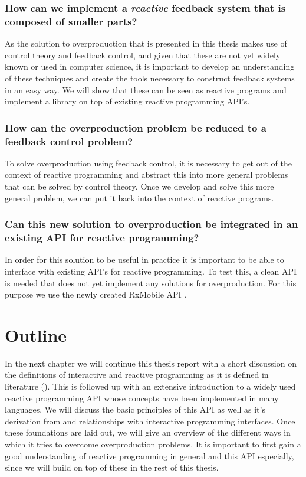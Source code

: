\subsubsection*{How can we implement a \emph{reactive} feedback system that is composed of smaller parts?} 
As the solution to overproduction that is presented in this thesis makes use of control theory and feedback control, and given that these are not yet widely known or used in computer science, it is important to develop an understanding of these techniques and create the tools necessary to construct feedback systems in an easy way. We will show that these can be seen as reactive programs and implement a library on top of existing reactive programming API's.

\subsubsection*{How can the overproduction problem be reduced to a feedback control problem?}
To solve overproduction using feedback control, it is necessary to get out of the context of reactive programming and abstract this into more general problems that can be solved by control theory. Once we develop and solve this more general problem, we can put it back into the context of reactive programs.

\subsubsection*{Can this new solution to overproduction be integrated in an existing API for reactive programming?}
In order for this solution to be useful in practice it is important to be able to interface with existing API's for reactive programming. To test this, a clean API is needed that does not yet implement any solutions for overproduction. For this purpose we use the newly created RxMobile API \cite{RxMobile}.

\section*{Outline}
In the next chapter we will continue this thesis report with a short discussion on the definitions of interactive and reactive programming as it is defined in literature (). This is followed up with an extensive introduction to a widely used reactive programming API whose concepts have been implemented in many languages. We will discuss the basic principles of this API as well as it's derivation from and relationships with interactive programming interfaces. Once these foundations are laid out, we will give an overview of the different ways in which it tries to overcome overproduction problems. It is important to first gain a good understanding of reactive programming in general and this API especially, since we will build on top of these in the rest of this thesis.

